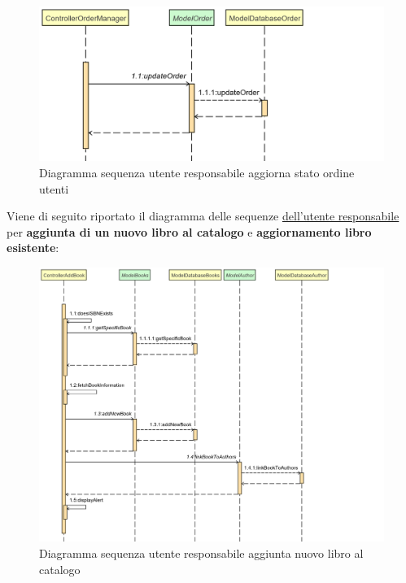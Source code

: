 \documentclass[a4paper,11pt]{report}
\begin{document}
    \begin{figure}[h!]
    	\centering
    	\hspace*{-0.4in}
    	\includegraphics[width=1.0\linewidth]{Sequence diagrams/3 Manager/updateOrderStatus.png}
    	\caption{Diagramma sequenza utente responsabile aggiorna stato ordine utenti}
    \end{figure}
\clearpage
Viene di seguito riportato il diagramma delle sequenze  \underline{dell'utente responsabile} per \textbf{aggiunta di un nuovo libro al catalogo} e \textbf{aggiornamento libro esistente}:\\
 \begin{figure}[h!]
    	\centering
    	\hspace*{-0.4in}
    	\includegraphics[width=1.4\linewidth]{Sequence diagrams/3 Manager/addBookToCatalogManager.png}
    	\caption{Diagramma sequenza utente responsabile aggiunta nuovo libro al catalogo}
    \end{figure}\\
\end{document}
